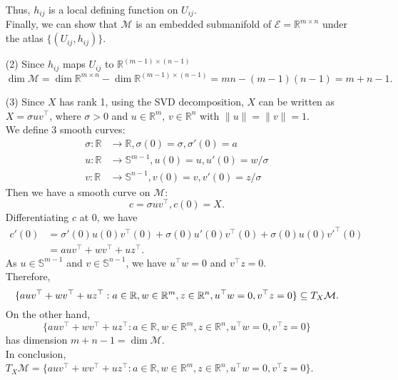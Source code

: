 \documentclass[en, oneside]{assignment}
\begin{document}
\begin{sol}
\begin{itemize}
        Thus, $h_{ij}$ is a local defining function on $U_{ij}$.\\
        Finally, we can show that $\mathcal{M}$ is an embedded submanifold of $\mathcal{E}= \mathbb{R}^{m \times n}$ under the atlas $\{(U_{ij}, h_{ij})\}$.
        \item[(2)] Since $h_{ij}$ maps $U_{ij}$ to $\mathbb{R}^{(m-1) \times (n-1)}$
        \begin{equation*}
            \dim{\mathcal{M}} = \dim{\mathbb{R}^{m \times n}} - \dim{\mathbb{R}^{(m-1) \times (n-1)}} = mn - (m-1)(n-1) = m + n - 1.
        \end{equation*}
        \item[(3)] Since $X$ has rank 1, using the SVD decomposition, 
        $X$ can be written as $X = \sigma u v^\top$, where $\sigma > 0$ and $u \in \mathbb{R}^m$, $v \in \mathbb{R}^n$ with $\|u\| = \|v\| = 1$.\\
        We define 3 smooth curves:
        \begin{align*}
            \sigma: \mathbb{R} & \to \mathbb{R}, \sigma(0) = \sigma, \sigma'(0) = a\\
            u: \mathbb{R} & \to \mathbb{S}^{m-1}, u(0) = u, u'(0) = w / \sigma\\
            v: \mathbb{R} & \to \mathbb{S}^{n-1} , v(0) = v, v'(0) = z / \sigma
        \end{align*}
        Then we have a smooth curve on $\mathcal{M}$:
        \begin{equation*}
            c = \sigma u v^\top, c(0) = X.
        \end{equation*}
        Differentiating $c$ at $0$, we have
        \begin{align*}
            c'(0) & = \sigma'(0)u(0)v^\top(0) + \sigma(0)u'(0)v^\top(0) + \sigma(0)u(0)v'^\top(0)\\
            & = a u v^\top + w v^\top + u z^\top.
        \end{align*}
        As $u \in \mathbb{S}^{m-1}$ and $v \in \mathbb{S}^{n-1}$, we have $u^\top w = 0$ and $v^\top z = 0$.\\
        Therefore, 
        \begin{equation*}
            \{a u v^\top + w v^\top + u z^\top: a \in \mathbb{R}, w \in \mathbb{R}^m, z \in \mathbb{R}^n, u^\top w = 0, v^\top z = 0\} \subseteq  T_X\mathcal{M}.\\
        \end{equation*}
        On the other hand, 
        \begin{equation*}
            {\{a u v^\top + w v^\top + u z^\top: a \in \mathbb{R}, w \in \mathbb{R}^m, z \in \mathbb{R}^n, u^\top w = 0, v^\top z = 0\}}
        \end{equation*}
        has dimension $m + n - 1 = \dim{\mathcal{M}}$.\\
        In conclusion, $T_X\mathcal{M} = \{a u v^\top + w v^\top + u z^\top: a \in \mathbb{R}, w \in \mathbb{R}^m, z \in \mathbb{R}^n, u^\top w = 0, v^\top z = 0\}$.
    \end{itemize}
\end{sol}
\end{document}
